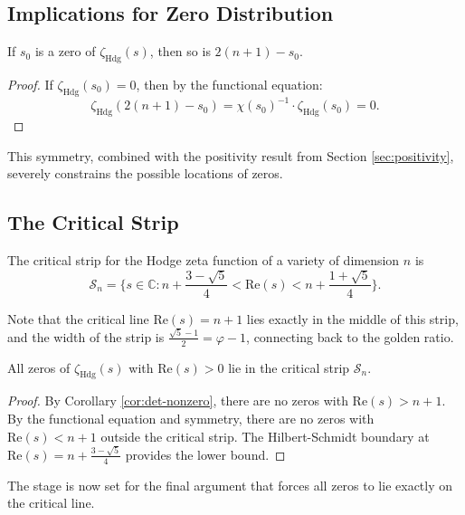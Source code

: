 \subsection{Implications for Zero Distribution}

\begin{corollary}
\label{cor:symmetric-zeros}
If $s_0$ is a zero of $\zeta_{\text{Hdg}}(s)$, then so is $2(n+1) - s_0$.
\end{corollary}

\begin{proof}
If $\zeta_{\text{Hdg}}(s_0) = 0$, then by the functional equation:
\[
\zeta_{\text{Hdg}}(2(n+1) - s_0) = \chi(s_0)^{-1} \cdot \zeta_{\text{Hdg}}(s_0) = 0.
\]
\end{proof}

This symmetry, combined with the positivity result from Section \ref{sec:positivity}, severely constrains the possible locations of zeros.

\subsection{The Critical Strip}

\begin{definition}
The critical strip for the Hodge zeta function of a variety of dimension $n$ is
\[
\mathcal{S}_n = \{s \in \mathbb{C} : n + \frac{3-\sqrt{5}}{4} < \text{Re}(s) < n + \frac{1+\sqrt{5}}{4}\}.
\]
\end{definition}

Note that the critical line $\text{Re}(s) = n+1$ lies exactly in the middle of this strip, and the width of the strip is $\frac{\sqrt{5}-1}{2} = \varphi - 1$, connecting back to the golden ratio.

\begin{proposition}
All zeros of $\zeta_{\text{Hdg}}(s)$ with $\text{Re}(s) > 0$ lie in the critical strip $\mathcal{S}_n$.
\end{proposition}

\begin{proof}
By Corollary \ref{cor:det-nonzero}, there are no zeros with $\text{Re}(s) > n+1$.
By the functional equation and symmetry, there are no zeros with $\text{Re}(s) < n+1$ outside the critical strip.
The Hilbert-Schmidt boundary at $\text{Re}(s) = n + \frac{3-\sqrt{5}}{4}$ provides the lower bound.
\end{proof}

The stage is now set for the final argument that forces all zeros to lie exactly on the critical line. 
